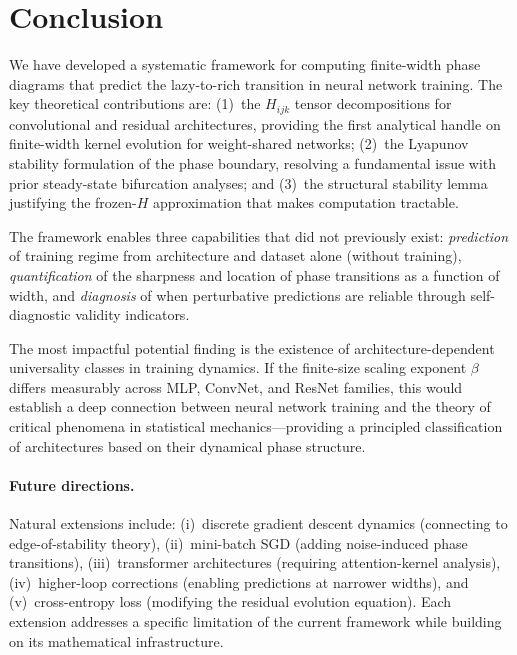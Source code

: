 \documentclass[11pt]{article}
\theoremstyle{definition}
\begin{document}
\section{Conclusion}
\label{sec:conclusion}

We have developed a systematic framework for computing finite-width phase diagrams that predict the lazy-to-rich transition in neural network training. The key theoretical contributions are: (1)~the $H_{ijk}$ tensor decompositions for convolutional and residual architectures, providing the first analytical handle on finite-width kernel evolution for weight-shared networks; (2)~the Lyapunov stability formulation of the phase boundary, resolving a fundamental issue with prior steady-state bifurcation analyses; and (3)~the structural stability lemma justifying the frozen-$H$ approximation that makes computation tractable.

The framework enables three capabilities that did not previously exist: \emph{prediction} of training regime from architecture and dataset alone (without training), \emph{quantification} of the sharpness and location of phase transitions as a function of width, and \emph{diagnosis} of when perturbative predictions are reliable through self-diagnostic validity indicators.

The most impactful potential finding is the existence of architecture-dependent universality classes in training dynamics. If the finite-size scaling exponent $\beta$ differs measurably across MLP, ConvNet, and ResNet families, this would establish a deep connection between neural network training and the theory of critical phenomena in statistical mechanics---providing a principled classification of architectures based on their dynamical phase structure.

\paragraph{Future directions.} Natural extensions include: (i)~discrete gradient descent dynamics (connecting to edge-of-stability theory), (ii)~mini-batch SGD (adding noise-induced phase transitions), (iii)~transformer architectures (requiring attention-kernel analysis), (iv)~higher-loop corrections (enabling predictions at narrower widths), and (v)~cross-entropy loss (modifying the residual evolution equation). Each extension addresses a specific limitation of the current framework while building on its mathematical infrastructure.
\end{document}
